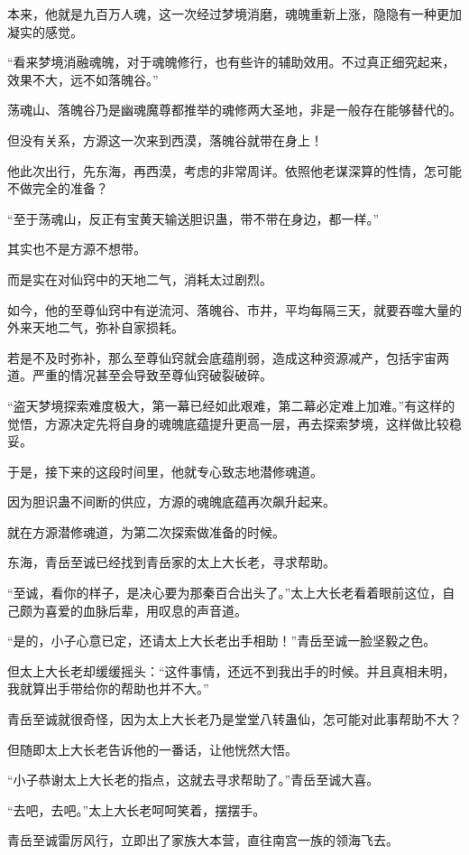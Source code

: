 \begin{this_body}
本来，他就是九百万人魂，这一次经过梦境消磨，魂魄重新上涨，隐隐有一种更加凝实的感觉。

“看来梦境消融魂魄，对于魂魄修行，也有些许的辅助效用。不过真正细究起来，效果不大，远不如落魄谷。”

荡魂山、落魄谷乃是幽魂魔尊都推举的魂修两大圣地，非是一般存在能够替代的。

但没有关系，方源这一次来到西漠，落魄谷就带在身上！

他此次出行，先东海，再西漠，考虑的非常周详。依照他老谋深算的性情，怎可能不做完全的准备？

“至于荡魂山，反正有宝黄天输送胆识蛊，带不带在身边，都一样。”

其实也不是方源不想带。

而是实在对仙窍中的天地二气，消耗太过剧烈。

如今，他的至尊仙窍中有逆流河、落魄谷、市井，平均每隔三天，就要吞噬大量的外来天地二气，弥补自家损耗。

若是不及时弥补，那么至尊仙窍就会底蕴削弱，造成这种资源减产，包括宇宙两道。严重的情况甚至会导致至尊仙窍破裂破碎。

“盗天梦境探索难度极大，第一幕已经如此艰难，第二幕必定难上加难。”有这样的觉悟，方源决定先将自身的魂魄底蕴提升更高一层，再去探索梦境，这样做比较稳妥。

于是，接下来的这段时间里，他就专心致志地潜修魂道。

因为胆识蛊不间断的供应，方源的魂魄底蕴再次飙升起来。

就在方源潜修魂道，为第二次探索做准备的时候。

东海，青岳至诚已经找到青岳家的太上大长老，寻求帮助。

“至诚，看你的样子，是决心要为那秦百合出头了。”太上大长老看着眼前这位，自己颇为喜爱的血脉后辈，用叹息的声音道。

“是的，小子心意已定，还请太上大长老出手相助！”青岳至诚一脸坚毅之色。

但太上大长老却缓缓摇头：“这件事情，还远不到我出手的时候。并且真相未明，我就算出手带给你的帮助也并不大。”

青岳至诚就很奇怪，因为太上大长老乃是堂堂八转蛊仙，怎可能对此事帮助不大？

但随即太上大长老告诉他的一番话，让他恍然大悟。

“小子恭谢太上大长老的指点，这就去寻求帮助了。”青岳至诚大喜。

“去吧，去吧。”太上大长老呵呵笑着，摆摆手。

青岳至诚雷厉风行，立即出了家族大本营，直往南宫一族的领海飞去。


\end{this_body}
